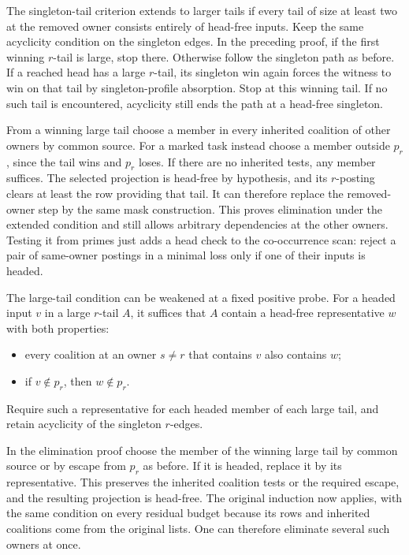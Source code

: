 The singleton-tail criterion extends to larger tails
if every tail of size at least two at the removed
owner consists entirely of head-free inputs. Keep
the same acyclicity condition on the singleton
edges. In the preceding proof, if the first
winning $r$-tail is large, stop there. Otherwise
follow the singleton path as before. If a reached
head has a large $r$-tail, its singleton win
again forces the witness to win on that tail by
singleton-profile absorption. Stop at this winning
tail. If no such tail is encountered, acyclicity
still ends the path at a head-free singleton.

From a winning large tail choose a member in
every inherited coalition of other owners by
common source. For a marked task instead choose
a member outside $p_r$, since the tail wins and
$p_r$ loses. If there are no inherited tests,
any member suffices. The selected projection is
head-free by hypothesis, and its $r$-posting
clears at least the row providing that tail.
It can therefore replace the removed-owner
step by the same mask construction. This proves
elimination under the extended condition and
still allows arbitrary dependencies at the other
owners. Testing it from primes just adds a
head check to the co-occurrence scan: reject
a pair of same-owner postings in a minimal
loss only if one of their inputs is headed.

The large-tail condition can be weakened at a fixed
positive probe. For a headed input $v$ in a large
$r$-tail $A$, it suffices that $A$ contain a head-free
representative $w$ with both properties:
\begin{itemize}
\item every coalition at an owner $s\ne r$ that
contains $v$ also contains $w$;
\item if $v\notin p_r$, then $w\notin p_r$.
\end{itemize}
Require such a representative for each headed
member of each large tail, and retain acyclicity
of the singleton $r$-edges.

In the elimination proof choose the member of
the winning large tail by common source or by
escape from $p_r$ as before. If it is headed,
replace it by its representative. This preserves
the inherited coalition tests or the required
escape, and the resulting projection is head-free.
The original induction now applies, with the same
condition on every residual budget because its
rows and inherited coalitions come from the
original lists. One can therefore eliminate
several such owners at once.

